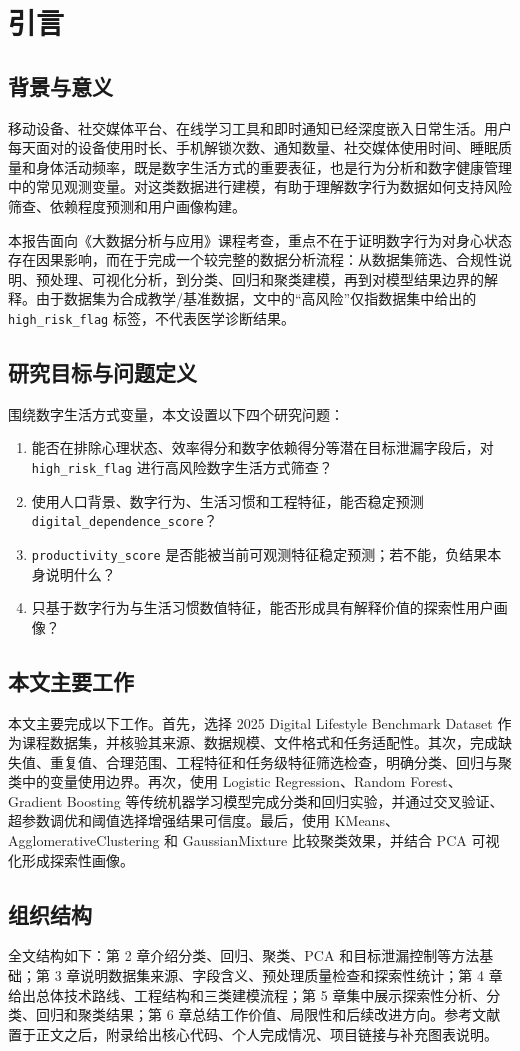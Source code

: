 \chapter{引言}

\section{背景与意义}

移动设备、社交媒体平台、在线学习工具和即时通知已经深度嵌入日常生活。用户每天面对的设备使用时长、手机解锁次数、通知数量、社交媒体使用时间、睡眠质量和身体活动频率，既是数字生活方式的重要表征，也是行为分析和数字健康管理中的常见观测变量。对这类数据进行建模，有助于理解数字行为数据如何支持风险筛查、依赖程度预测和用户画像构建。

本报告面向《大数据分析与应用》课程考查，重点不在于证明数字行为对身心状态存在因果影响，而在于完成一个较完整的数据分析流程：从数据集筛选、合规性说明、预处理、可视化分析，到分类、回归和聚类建模，再到对模型结果边界的解释。由于数据集为合成教学/基准数据，文中的“高风险”仅指数据集中给出的 \texttt{high\_risk\_flag} 标签，不代表医学诊断结果。

\section{研究目标与问题定义}

围绕数字生活方式变量，本文设置以下四个研究问题：

\begin{enumerate}
  \item 能否在排除心理状态、效率得分和数字依赖得分等潜在目标泄漏字段后，对 \texttt{high\_risk\_flag} 进行高风险数字生活方式筛查？
  \item 使用人口背景、数字行为、生活习惯和工程特征，能否稳定预测 \texttt{digital\_dependence\_score}？
  \item \texttt{productivity\_score} 是否能被当前可观测特征稳定预测；若不能，负结果本身说明什么？
  \item 只基于数字行为与生活习惯数值特征，能否形成具有解释价值的探索性用户画像？
\end{enumerate}

\section{本文主要工作}

本文主要完成以下工作。首先，选择 2025 Digital Lifestyle Benchmark Dataset 作为课程数据集，并核验其来源、数据规模、文件格式和任务适配性。其次，完成缺失值、重复值、合理范围、工程特征和任务级特征筛选检查，明确分类、回归与聚类中的变量使用边界。再次，使用 Logistic Regression、Random Forest、Gradient Boosting 等传统机器学习模型完成分类和回归实验，并通过交叉验证、超参数调优和阈值选择增强结果可信度。最后，使用 KMeans、AgglomerativeClustering 和 GaussianMixture 比较聚类效果，并结合 PCA 可视化形成探索性画像。

\section{组织结构}

全文结构如下：第 2 章介绍分类、回归、聚类、PCA 和目标泄漏控制等方法基础；第 3 章说明数据集来源、字段含义、预处理质量检查和探索性统计；第 4 章给出总体技术路线、工程结构和三类建模流程；第 5 章集中展示探索性分析、分类、回归和聚类结果；第 6 章总结工作价值、局限性和后续改进方向。参考文献置于正文之后，附录给出核心代码、个人完成情况、项目链接与补充图表说明。
